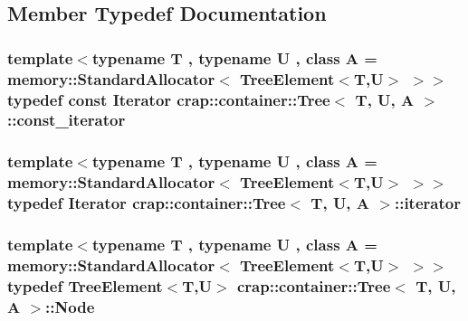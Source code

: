\subsection{Member Typedef Documentation}
\hypertarget{classcrap_1_1container_1_1_tree_ac0b874e8b0b5e75401f4acaf2880cd4d}{
\subsubsection[{const\-\_\-iterator}]{\setlength{\rightskip}{0pt plus 5cm}template$<$typename T , typename U , class A  = memory\-::\-Standard\-Allocator$<$ Tree\-Element$<$\-T,\-U$>$ $>$$>$ typedef const {\bf Iterator} {\bf crap\-::container\-::\-Tree}$<$ T, U, A $>$\-::{\bf const\-\_\-iterator}}}\label{classcrap_1_1container_1_1_tree_ac0b874e8b0b5e75401f4acaf2880cd4d}
\hypertarget{classcrap_1_1container_1_1_tree_a6fc9dffe6a291f6b1b6dc52ef2602eb9}{
\subsubsection[{iterator}]{\setlength{\rightskip}{0pt plus 5cm}template$<$typename T , typename U , class A  = memory\-::\-Standard\-Allocator$<$ Tree\-Element$<$\-T,\-U$>$ $>$$>$ typedef {\bf Iterator} {\bf crap\-::container\-::\-Tree}$<$ T, U, A $>$\-::{\bf iterator}}}\label{classcrap_1_1container_1_1_tree_a6fc9dffe6a291f6b1b6dc52ef2602eb9}
\hypertarget{classcrap_1_1container_1_1_tree_a03cefa95016ea47daa5e93705ad1afe7}{
\subsubsection[{Node}]{\setlength{\rightskip}{0pt plus 5cm}template$<$typename T , typename U , class A  = memory\-::\-Standard\-Allocator$<$ Tree\-Element$<$\-T,\-U$>$ $>$$>$ typedef {\bf Tree\-Element}$<$T,U$>$ {\bf crap\-::container\-::\-Tree}$<$ T, U, A $>$\-::{\bf Node}}}\label{classcrap_1_1container_1_1_tree_a03cefa95016ea47daa5e93705ad1afe7}


